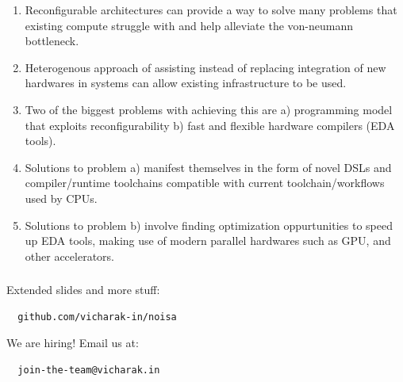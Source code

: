 \documentclass{beamer}
\begin{document}
{\begin{frame}[fragile]
  \begin{enumerate}
    \item Reconfigurable architectures can provide a way to solve many problems
      that existing compute struggle with and help alleviate the von-neumann
      bottleneck.
    \item Heterogenous approach of assisting instead of replacing integration of
      new hardwares in systems can allow existing infrastructure to be used.
    \item Two of the biggest problems with achieving this are a) programming
      model that exploits reconfigurability b) fast and flexible hardware
      compilers (EDA tools).
    \item Solutions to problem a) manifest themselves in the form of novel DSLs
      and compiler/runtime toolchains compatible with current
      toolchain/workflows used by CPUs.
    \item Solutions to problem b) involve finding optimization oppurtunities
      to speed up EDA tools, making use of modern parallel hardwares such as
      GPU, and other accelerators.
  \end{enumerate}
\end{frame}

\begin{frame}[fragile]
  \frametitle{}
  \framesubtitle{}

  Extended slides and more stuff: 

  \begin{verbatim}
  github.com/vicharak-in/noisa
  \end{verbatim}

  We are hiring! Email us at: 

  \begin{verbatim}
  join-the-team@vicharak.in
  \end{verbatim}

\end{frame}

}
\end{document}
